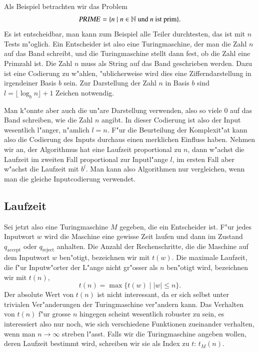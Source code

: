 Als Beispiel betrachten wir das Problem
\[
\text{\textsl{PRIME}}=\{ n\;|\; \text{$n\in\mathbb N$ und $n$ ist prim}\}.
\]
Es ist entscheidbar, man kann zum Beispiel alle Teiler durchtesten,
das ist mit $n$ Tests m"oglich. Ein Entscheider ist also eine Turingmaschine,
der man die Zahl $n$ auf das Band schreibt, und die Turingmaschine
stellt dann fest, ob die Zahl eine Primzahl ist. Die Zahl $n$ muss
als String auf das Band geschrieben werden. Dazu ist eine Codierung
zu w"ahlen, "ublicherweise wird dies eine Zifferndarstellung in
irgendeiner Basis $b$ sein. Zur Darstellung der Zahl $n$ in Basis $b$
sind $l=\lfloor \log_bn\rfloor+1$ Zeichen notwendig.

Man k"onnte aber auch die un"are Darstellung verwenden, also so viele
$0$ auf das Band schreiben, wie die Zahl $n$ angibt. In dieser Codierung
ist also der Input wesentlich l"anger, n"amlich $l=n$.
F"ur die Beurteilung der
Komplexit"at kann also die Codierung des Inputs durchaus einen
merklichen Einfluss haben. Nehmen wir an, der Algorithmus hat
eine Laufzeit proportional zu $n$, dann w"achst die Laufzeit im
zweiten Fall proportional zur Inputl"ange $l$, im ersten Fall
aber w"achst die Laufzeit mit $b^l$. Man kann also Algorithmen
nur vergleichen, wenn man die gleiche Inputcodierung verwendet.

\subsection{Laufzeit}
Sei jetzt also eine Turingmaschine $M$ gegeben, die ein Entscheider
ist. F"ur jedes Inputwort $w$ wird die Maschine eine gewisse Zeit
laufen und dann im Zustand $q_{\text{accept}}$ oder $q_{\text{reject}}$
anhalten. Die Anzahl der Rechenschritte, die die Maschine auf dem
Inputwort $w$ ben"otigt, bezeichnen wir mit $t(w)$.
Die maximale Laufzeit, die f"ur Inputw"orter der L"ange nicht
gr"osser als $n$ ben"otigt wird, bezeichnen wir mit $t(n)$,
\[
t(n)=\max \{ t(w)\;|\; |w|\le n\}.
\]
Der absolute Wert von $t(n)$ ist nicht interessant, da er sich
selbst unter trivialen Ver"anderungen der Turingmaschine ver"andern
kann. Das Verhalten von $t(n)$ f"ur grosse $n$ hingegen scheint
wesentlich robuster zu sein, es interessiert also nur noch, wie
sich verschiedene Funktionen zueinander verhalten, wenn man $n\to\infty$
streben l"asst. Falls wir die Turingmaschine angeben wollen, deren
Laufzeit bestimmt wird, schreiben wir sie als Index zu $t$: $t_M(n)$.

